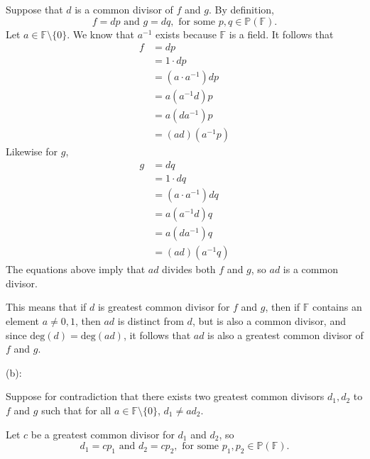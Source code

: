 \documentclass{article}
\theoremstyle{plain} %
\numberwithin{thm}{section} %
\theoremstyle{definition}
\begin{document}
\begin{question}{7}
        Suppose that \(d\) is a common divisor of \(f\) and \(g\). By definition,
        \[
            f = dp \text{ and } g = dq, \text{ for some } p, q \in \mathbb{P} (\mathbb{F}).
        \]
        Let \(a \in \mathbb{F} \setminus \{0\}\). We know that \(a ^{-1}\) exists because \(\mathbb{F}\) is a field. It follows that
        \begin{align*}
            f &= dp \\
            &= 1 \cdot dp \tag{additive identity} \\
            &= (a \cdot a ^{-1})dp \\
            &= a (a^{-1}d) p \tag{associativity} \\
            &= a(d a^{-1}) p \tag{commutativity} \\
            &= (ad)(a^{-1} p) \tag{associativity}
        \end{align*}
        Likewise for \(g\),
        \begin{align*}
            g &= dq \\
            &= 1 \cdot dq \tag{additive identity} \\
            &= (a \cdot a ^{-1})dq \\
            &= a (a^{-1}d) q \tag{associativity} \\
            &= a(d a^{-1}) q \tag{commutativity} \\
            &= (ad)(a^{-1} q) \tag{associativity}
        \end{align*}
        The equations above imply that \(ad\) divides both \(f\) and \(g\), so \(ad\) is a common divisor.

        This means that if \(d\) is greatest common divisor for \(f\) and \(g\), then if \(\mathbb{F}\) contains an element \(a \neq 0, 1\), then \(ad\) is distinct from \(d\), but is also a common divisor, and since \(\mathrm{deg} (d) = \mathrm{deg} (ad)\), it follows that \(ad\) is also a greatest common divisor of \(f\) and \(g\).

        \medskip

        (b):

        Suppose for contradiction that there exists two greatest common divisors \(d_1, d_2\) to \(f\) and \(g\) such that for all \(a \in \mathbb{F}\setminus \{0\}\), \(d_1 \neq ad_2\).

        Let \(c\) be a greatest common divisor for \(d_1\) and \(d_2\), so
        \[
            d_1 = c p_1 \text{ and } d_2 = c p_2, \text{ for some } p_1, p_2 \in \mathbb{P} (\mathbb{F}).
        \]
    \end{question}
\end{document}

